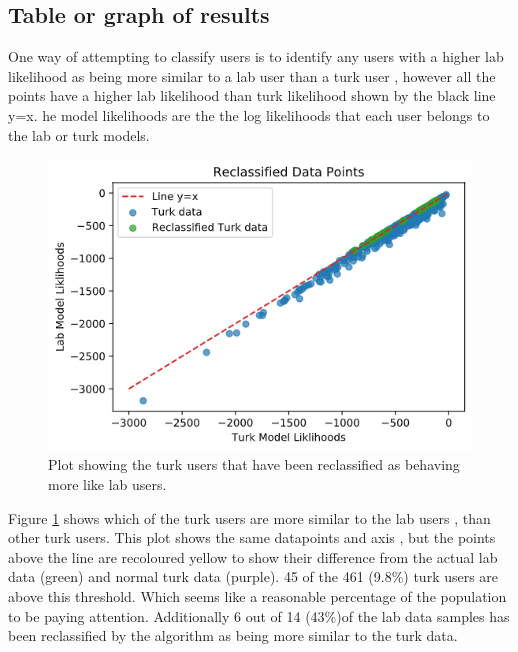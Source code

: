 \documentclass{article}
\begin{document}
\subsection{Table or graph of results}

One way of attempting to classify users is to identify any users with a higher lab likelihood as being more similar to a lab user than a turk user
, however all the points have a higher lab likelihood than turk likelihood shown by the black line y=x.
he model likelihoods are the the log likelihoods that each user belongs to the lab or turk models. 


\begin{figure}[ht!]
    \centering
    \includegraphics[scale=0.5]{Images/Reclassified-Data.png}
    \caption{Plot showing the turk users that have been reclassified as behaving more like lab users. }
    \label{fig:Reclassified}
\end{figure}

Figure \ref{fig:Reclassified} shows which of the turk users are more similar to the lab users
, than other turk users. 
This plot shows the same datapoints and axis
, but the points above the line are recoloured yellow to show their difference from the actual lab data (green) and normal turk data (purple). 
45 of the 461 (9.8\%) turk users are above this threshold. 
Which seems like a reasonable percentage of the population to be paying attention. 
Additionally 6 out of 14 (43\%)of the lab data samples has been reclassified by the algorithm as being more similar to the turk data.
\end{document}
